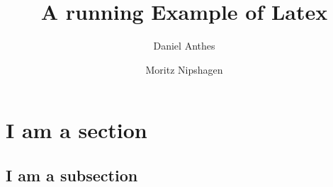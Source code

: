 \documentclass[12pt]{scrarticle}
\title{A running Example of Latex}
\author{Daniel Anthes \and Moritz Nipshagen}
\date{} %
\begin{document}
\maketitle

\section{I am a section}

\lipsum[1]

\subsection{I am a subsection}

\lipsum[2]
\end{document}
